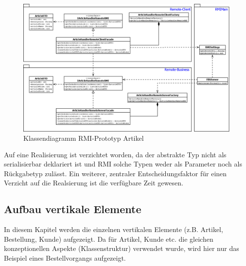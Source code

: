\begin{figure}[H]
	\centering
	\includegraphics[width=0.9\linewidth]{Images/RMI-Classdia-concept.png}
	\caption{Klassendiagramm RMI-Prototyp Artikel}
	\label{fig:class-RMI}
\end{figure}

Auf eine Realisierung ist verzichtet worden, da der abstrakte Typ  nicht als serialisierbar deklariert ist und RMI solche Typen weder als Parameter noch als Rückgabetyp zulässt. Ein weiterer, zentraler Entscheidungsfaktor für einen Verzicht auf die Realsierung ist die verfügbare Zeit gewesen. 
\clearpage
\subsection{Aufbau vertikale Elemente}
In diesem Kapitel werden die einzelnen vertikalen Elemente (z.B. Artikel, Bestellung, Kunde) aufgezeigt. Da für Artikel, Kunde etc. die gleichen konzeptionellen Aspekte (Klassenstruktur) verwendet wurde, wird hier nur das Beispiel eines Bestellvorgangs aufgezeigt.
